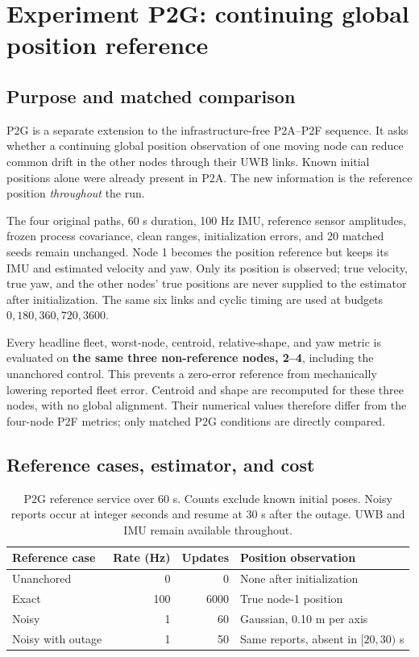 \section{Experiment P2G: continuing global position reference}
\label{sec:p2g}
\subsection{Purpose and matched comparison}
P2G is a separate extension to the infrastructure-free P2A--P2F sequence. It asks whether a continuing global position observation of one moving node can reduce common drift in the other nodes through their UWB links. Known initial positions alone were already present in P2A. The new information is the reference position \emph{throughout} the run.

The four original paths, 60 s duration, 100 Hz IMU, reference sensor amplitudes, frozen process covariance, clean ranges, initialization errors, and 20 matched seeds remain unchanged. Node 1 becomes the position reference but keeps its IMU and estimated velocity and yaw. Only its position is observed; true velocity, true yaw, and the other nodes' true positions are never supplied to the estimator after initialization. The same six links and cyclic timing are used at budgets \(0,180,360,720,3600\).

Every headline fleet, worst-node, centroid, relative-shape, and yaw metric is evaluated on \textbf{the same three non-reference nodes, 2--4}, including the unanchored control. This prevents a zero-error reference from mechanically lowering reported fleet error. Centroid and shape are recomputed for these three nodes, with no global alignment. Their numerical values therefore differ from the four-node P2F metrics; only matched P2G conditions are directly compared.

\subsection{Reference cases, estimator, and cost}
\begin{table}[htbp]
\centering\small
\begin{tabular}{lrrl}
\toprule
Reference case & Rate (Hz) & Updates & Position observation\\
\midrule
Unanchored & 0 & 0 & None after initialization\\
Exact & 100 & 6000 & True node-1 position\\
Noisy & 1 & 60 & Gaussian, 0.10 m per axis\\
Noisy with outage & 1 & 50 & Same reports, absent in $[20,30)$ s\\
\bottomrule
\end{tabular}
\caption{P2G reference service over 60 s. Counts exclude known initial poses. Noisy reports occur at integer seconds and resume at 30 s after the outage. UWB and IMU remain available throughout.}
\label{tab:p2g_cases}
\end{table}

